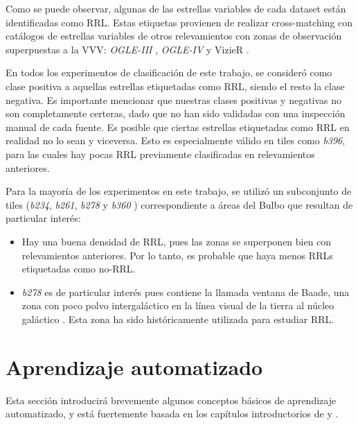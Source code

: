 \par Como se puede observar, algunas de las estrellas variables de cada dataset están identificadas como RRL. Estas etiquetas provienen de realizar cross-matching con catálogos de estrellas variables de otros relevamientos con zonas de observación superpuestas a la VVV: \textit{OGLE-III} \cite{Udalski}, \textit{OGLE-IV} \cite{Udalski2} y VizieR \cite{vizier}. \\

\par En todos los experimentos de clasificación de este trabajo, se consideró como clase positiva a aquellas estrellas etiquetadas como RRL, siendo el resto la clase negativa. Es importante mencionar que nuestras clases positivas y negativas no son completamente certeras, dado que no han sido validadas con una inspección manual de cada fuente. Es posible que ciertas estrellas etiquetadas como RRL en realidad no lo sean y viceversa. Esto es especialmente válido en tiles como \textit{b396}, para las cuales hay pocas RRL previamente clasificadas en relevamientos anteriores. \\

\par Para la mayoría de los experimentos en este trabajo, se utilizó un subconjunto de tiles (\textit{b234}, \textit{b261}, \textit{b278} y \textit{b360} ) correspondiente a áreas del Bulbo que resultan de particular interés:

\begin{itemize}
\item Hay una buena densidad de RRL, pues las zonas se superponen bien con relevamientos anteriores. Por lo tanto, es probable que haya menos RRLs etiquetadas como no-RRL.

\item \textit{b278} es de particular interés pues contiene la llamada ventana de Baade, una zona con poco polvo intergaláctico en la línea visual de la tierra al núcleo galáctico \cite{Baade}. Esta zona ha sido históricamente utilizada para estudiar RRL.

\end{itemize}

\section {Aprendizaje automatizado}

Esta sección introducirá brevemente algunos conceptos básicos de aprendizaje automatizado, y está fuertemente basada en los capítulos introductorios de \cite{mitchell} y \cite{slearning}.

